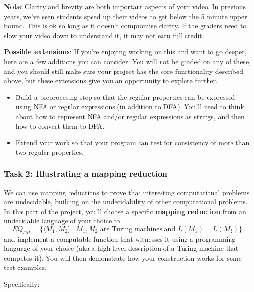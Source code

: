 \documentclass[12pt, oneside]{article}
\begin{document}
{\bf Note}: Clarity and brevity are both important aspects of your video.  In previous years, we've seen 
students speed up their videos to get below the 5 minute upper bound. This is ok so long as it doesn't 
compromise clarity. If the graders need to slow your video down to understand
it, it may not earn full credit.



{\bf Possible extensions}: If you're enjoying working on this and want to go deeper, here are a few additions you can consider. You will not be graded on any of these, and you should still make sure your project has the core functionality described above, but these extensions give you an opportunity to explore further.
\begin{itemize}
   \item Build a preprocesing step so that the regular properties can be expressed using NFA or regular expressions (in addition to DFA). You'll need to think about how to represent NFA and/or regular expressions as strings, and then how to convert them to DFA.
   \item Extend your work so that your program can test for consistency of more than two regular properties.
\end{itemize}

\newpage
\subsubsection*{Task 2: Illustrating a mapping reduction}

We can use mapping reductions to prove that interesting computational 
problems are undecidable, building on 
the undecidability of other computational problems.
In this part of the project, you'll choose a specific {\bf mapping reduction}
from an undecidable language of your choice to 
$$EQ_{TM} = \{ \langle M_1, M_2 \rangle \mid M_1, M_2 \text{ are Turing machines and } L(M_1) = L(M_2) \}$$
and implement a computable function that witnesses it
using a  programming language of your choice (aka a high-level description of a Turing machine that computes it).
You will then demonstrate  how your construction works for some test examples.

Specifically:

\vspace{-20pt}
\end{document}
